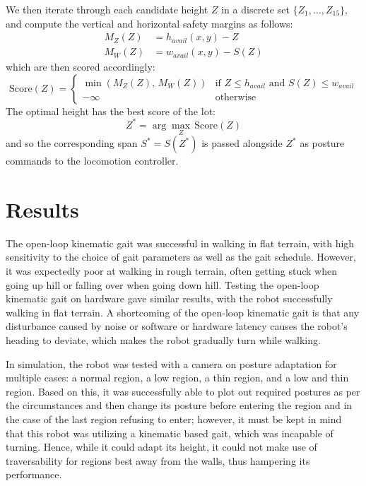 We then iterate through each candidate height $Z$ in a discrete set
$\{Z_1, \dots, Z_{15}\}$, and compute the vertical and horizontal safety margins
as follows:
\begin{align}
    M_Z(Z) &= h_{avail}(x, y) - Z \\
    M_W(Z) &= w_{avail}(x, y) - S(Z)
\end{align}
which are then scored accordingly:
\begin{equation}
    \text{Score}(Z) = \begin{cases} \min(M_Z(Z),\, M_W(Z)) & \text{if } Z \leq h_{avail} \text{ and } S(Z) \leq w_{avail} \\ -\infty & \text{otherwise} \end{cases}
\end{equation}
The optimal height has the best score of the lot:
\begin{equation}
    Z^* = \arg\max_{Z}\, \text{Score}(Z)
\end{equation}
and so the corresponding span $S^* = S(Z^*)$ is passed alongside $Z^*$ as
posture commands to the locomotion controller.

\section{Results}

The open-loop kinematic gait was successful in walking in flat terrain, with high sensitivity to the choice of gait parameters as well as the gait schedule. However, it was expectedly poor at walking in rough terrain, often getting stuck when going up hill or falling over when going down hill. Testing the open-loop kinematic gait on hardware gave similar results, with the robot successfully walking in flat terrain. A shortcoming of the open-loop kinematic gait is that any disturbance caused by noise or software or hardware latency causes the robot's heading to deviate, which makes the robot gradually turn while walking.

In simulation, the robot was tested with a camera on posture adaptation for multiple cases: a normal region, a low region, a thin region, and a low and thin region. Based on this, it was successfully able to plot out required postures as per the circumstances and then change its posture before entering the region and in the case of the last region refusing to enter; however, it must be kept in mind that this robot was utilizing a kinematic based gait, which was incapable of turning. Hence, while it could adapt its height, it could not make use of traversability for regions best away from the walls, thus hampering its performance. 

